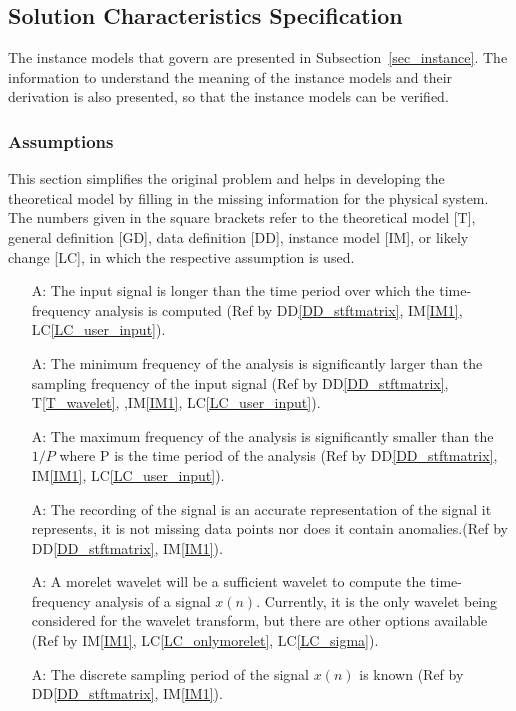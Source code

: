 \documentclass[12pt]{article}
\newcounter{assumpnum} %
\begin{document}
\subsection{Solution Characteristics Specification}

The instance models that govern \progname{} are presented in
Subsection~\ref{sec_instance}.  The information to understand the meaning of the
instance models and their derivation is also presented, so that the instance
models can be verified.

\subsubsection{Assumptions} \label{sec_assumpt}

This section simplifies the original problem and helps in developing the
theoretical model by filling in the missing information for the physical
system. The numbers given in the square brackets refer to the theoretical model
[T], general definition [GD], data definition [DD], instance model [IM], or
likely change [LC], in which the respective assumption is used.

\begin{itemize}

\item[A\refstepcounter{assumpnum}\theassumpnum \label{mintime_assum}:] The input signal is longer than the time period over which the time-frequency analysis is computed (Ref by DD\ref{DD_stftmatrix}, IM\ref{IM1}, LC\ref{LC_user_input}).
\item[A\refstepcounter{assumpnum}\theassumpnum \label{minfreq_assum}:] The minimum frequency of the analysis is significantly larger than the sampling frequency of the input signal (Ref by DD\ref{DD_stftmatrix}, T\ref{T_wavelet}, ,IM\ref{IM1}, LC\ref{LC_user_input}).
\item[A\refstepcounter{assumpnum}\theassumpnum \label{maxfreq_assum}:] The maximum frequency of the analysis is significantly smaller than the $1/P$ where P is the time period of the analysis (Ref by DD\ref{DD_stftmatrix}, IM\ref{IM1}, LC\ref{LC_user_input}).
\item[A\refstepcounter{assumpnum}\theassumpnum \label{representation_assum}:]The recording of the signal is an accurate representation of the signal it represents, it is not missing data points nor does it contain anomalies.(Ref by DD\ref{DD_stftmatrix}, IM\ref{IM1}).
\item[A\refstepcounter{assumpnum}\theassumpnum \label{morelet_assum}:]A morelet wavelet will be a sufficient wavelet to compute the time-frequency analysis of a signal $x(n)$. Currently, it is the only wavelet being considered for the wavelet transform, but there are other options available (Ref by IM\ref{IM1}, LC\ref{LC_onlymorelet}, LC\ref{LC_sigma}).
\item[A\refstepcounter{assumpnum}\theassumpnum \label{P_assum}:]The discrete sampling period of the signal $x(n)$ is known (Ref by DD\ref{DD_stftmatrix}, IM\ref{IM1}).

\end{itemize}
\end{document}
